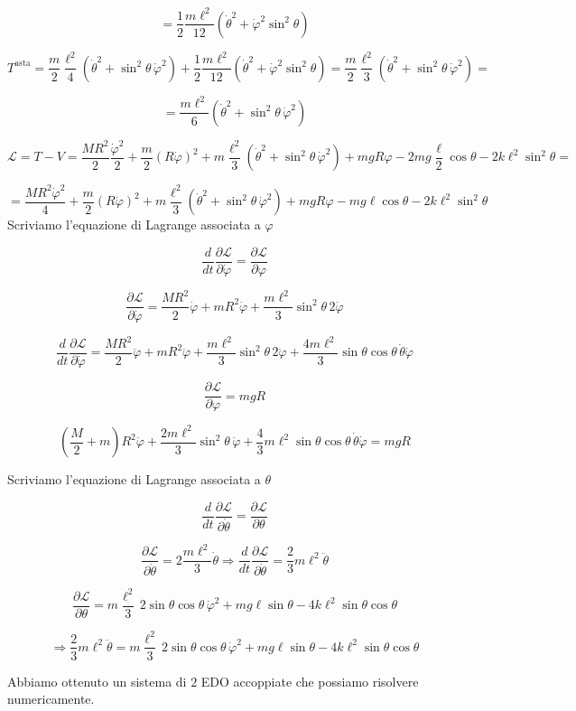 \begin{example}{}
\[
=
\frac{1}{2}
\frac{m\ell^2}{12}
\left(
\dot{\theta}^2+\dot{\varphi}^2\sin^2\theta
\right)
\]

\[
T^{\text{asta}}
=
\frac{m}{2}
\frac{\ell^2}{4}
\left(
\dot{\theta}^2+\sin^2\theta\,\dot{\varphi}^2
\right)
+
\frac{1}{2}
\frac{m\ell^2}{12}
\left(
\dot{\theta}^2+\dot{\varphi}^2\sin^2\theta
\right)
=
\frac{m}{2}
\frac{\ell^2}{3}
\left(
\dot{\theta}^2+\sin^2\theta\,\dot{\varphi}^2
\right)
=
\]

\[
=
\frac{m\ell^2}{6}
\left(
\dot{\theta}^2+\sin^2\theta\,\dot{\varphi}^2
\right)
\]

\[
\mathcal{L}
=
T-V
=
\frac{MR^2}{2}\frac{\dot{\varphi}^2}{2}
+
\frac{m}{2}
\left(R\dot{\varphi}\right)^2
+
m\frac{\ell^2}{3}
\left(
\dot{\theta}^2+\sin^2\theta\,\dot{\varphi}^2
\right)
+
mgR\varphi
-
2mg\frac{\ell}{2}\cos\theta
-
2k\ell^2\sin^2\theta
=
\]

\[
=
\frac{MR^2\dot{\varphi}^2}{4}
+
\frac{m}{2}
\left(R\dot{\varphi}\right)^2
+
m\frac{\ell^2}{3}
\left(
\dot{\theta}^2+\sin^2\theta\,\dot{\varphi}^2
\right)
+
mgR\varphi
-
mg\ell\cos\theta
-
2k\ell^2\sin^2\theta
\]
Scriviamo l'equazione di Lagrange associata a \(\varphi\)

\[
\frac{d}{dt}
\frac{\partial \mathcal{L}}{\partial \dot{\varphi}}
=
\frac{\partial \mathcal{L}}{\partial \varphi}
\]

\[
\frac{\partial \mathcal{L}}{\partial \dot{\varphi}}
=
\frac{MR^2}{2}\dot{\varphi}
+
mR^2\dot{\varphi}
+
\frac{m\ell^2}{3}\sin^2\theta\,2\dot{\varphi}
\]

\[
\frac{d}{dt}
\frac{\partial \mathcal{L}}{\partial \dot{\varphi}}
=
\frac{MR^2}{2}\ddot{\varphi}
+
mR^2\ddot{\varphi}
+
\frac{m\ell^2}{3}\sin^2\theta\,2\ddot{\varphi}
+
\frac{4m\ell^2}{3}\sin\theta\cos\theta\,\dot{\theta}\dot{\varphi}
\]

\[
\frac{\partial \mathcal{L}}{\partial \varphi}
=
mgR
\]

\[
\left(\frac{M}{2}+m\right)R^2\ddot{\varphi}
+
\frac{2m\ell^2}{3}\sin^2\theta\,\ddot{\varphi}
+
\frac{4}{3}m\ell^2\sin\theta\cos\theta\,\dot{\theta}\dot{\varphi}
=
mgR
\]

Scriviamo l'equazione di Lagrange associata a \(\theta\)

\[
\frac{d}{dt}
\frac{\partial \mathcal{L}}{\partial \dot{\theta}}
=
\frac{\partial \mathcal{L}}{\partial \theta}
\]

\[
\frac{\partial \mathcal{L}}{\partial \dot{\theta}}
=
2\frac{m\ell^2}{3}\dot{\theta}
\Rightarrow
\frac{d}{dt}
\frac{\partial \mathcal{L}}{\partial \dot{\theta}}
=
\frac{2}{3}m\ell^2\ddot{\theta}
\]

\[
\frac{\partial \mathcal{L}}{\partial \theta}
=
m\frac{\ell^2}{3}\,2\sin\theta\cos\theta\,\dot{\varphi}^2
+
mg\ell\sin\theta
-
4k\ell^2\sin\theta\cos\theta
\]

\[
\Rightarrow
\frac{2}{3}m\ell^2\ddot{\theta}
=
m\frac{\ell^2}{3}\,2\sin\theta\cos\theta\,\dot{\varphi}^2
+
mg\ell\sin\theta
-
4k\ell^2\sin\theta\cos\theta
\]

Abbiamo ottenuto un sistema di \(2\) EDO accoppiate che possiamo risolvere numericamente.
\end{example}
